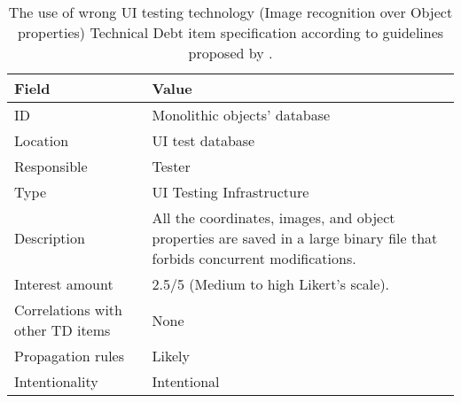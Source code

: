 	\begin{table}[!htbp]
		\centering
		\tabulinesep=1.2mm
		\begin{tabu} to \textwidth {|X|X[3]|}
			
			\hline
			\textbf{Field} & \textbf{Value} \\ 
			\hline
			
			ID & Monolithic objects' database\\
			\hline
			
			Location & UI test database \\
			\hline
			
			Responsible & Tester \\
			\hline
			
			Type & UI Testing Infrastructure \\
			\hline	
			
			Description & All the coordinates, images, and object properties are saved in a large binary file that forbids concurrent modifications.\\
			\hline
			
			
			
			Interest amount &  2.5/5 (Medium to high Likert's scale). \\
			\hline
			
			
			
			Correlations with other TD items & None\\
			\hline 	 
			
			
			
			Propagation rules & Likely\\
			\hline
			
			Intentionality & Intentional \\
			\hline 	 	
			
		\end{tabu}
		\caption[Use of wrong UI testing technology - Image recognition over Objects' properties - TD item specification]{The use of wrong UI testing technology (Image recognition over Object properties) Technical Debt item specification according to guidelines proposed by \cite{mapping_study_td}.}
		\label{tab:res-monolithic-db}
	\end{table}
	

